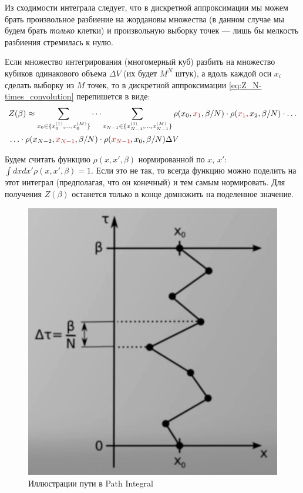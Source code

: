 \begin{lecture}
Из сходимости интеграла следует, что в дискретной аппроксимации мы можем брать произвольное разбиение на жордановы множества (в данном случае мы будем брать \textit{только} клетки) и произвольную выборку точек --- лишь бы мелкость разбиения стремилась к нулю.

Если множество интегрирования (многомерный куб) разбить на множество кубиков одинакового объема $\Delta V$ (их будет $M^N$ штук), а вдоль каждой оси $x_i$ сделать выборку из $M$ точек, то в дискретной аппроксимации \eqref{eq:Z_N-times_convolution} перепишется в виде:
\begin{align}
    \label{eq:Z_N-times_convolution-discrete}
    \nonumber
    & Z (\beta) \approx \sum\limits_{x_0 \in \{x_0^{(1)}, \dots, x_0^{(M)}\}} \dots \sum\limits_{x_{N-1} \in \{x_{N-1}^{(1)}, \dots, x_{N-1}^{(M)}\}}
    \rho (x_0, {\color{red} x_1}, \beta / N) \cdot \rho ({\color{red} x_1}, x_2, \beta / N) \cdot \dots \\
    & \ldots \cdot \rho (x_{N-2}, {\color{red} x_{N-1}}, \beta / N) \cdot \rho ({\color{red} x_{N-1}}, x_0, \beta / N) \Delta V
\end{align}

Будем считать функцию $\rho (x, x', \beta)$ нормированной по $x$, $x'$: $\int dx dx' \rho (x, x', \beta) = 1$.
Если это не так, то всегда функцию можно поделить на этот интеграл (предполагая, что он конечный) и тем самым нормировать.
Для получения $Z(\beta)$ останется только в конце домножить на поделенное значение.

\begin{figure}
    \label{fig:path-integral-schema}
    \centering
    \includegraphics[width=\linewidth]{fig/path-integral}
    \caption{Иллюстрации пути в Path Integral}
\end{figure}


\end{lecture}
